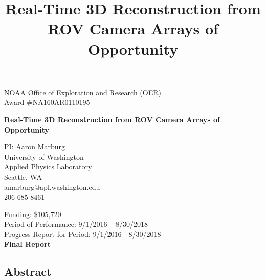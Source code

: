 \documentclass[letterpaper,12pt]{article}
\title{Real-Time 3D Reconstruction from ROV Camera Arrays of Opportunity}
\begin{document}
\begin{center} 

\vfill

{\large NOAA Office of Exploration and Research (OER)\\
Award \#NA160AR0110195}

\vspace{1em}

\textbf{\Large Real-Time 3D Reconstruction from ROV Camera Arrays of Opportunity}

\vfill

PI: Aaron Marburg \\
University of Washington  \\
Applied Physics Laboratory \\
Seattle, WA \\
amarburg@apl.washington.edu \\
206-685-8461

\vfill

Funding:  \$105,720 \\
Period of Performance:  9/1/2016 – 8/30/2018\\
Progress Report for Period:   9/1/2016 - 8/30/2018 \\
\textbf{Final Report}

\vfill 

%
\end{center} \clearpage


\subsection*{Abstract} 
\end{document}
